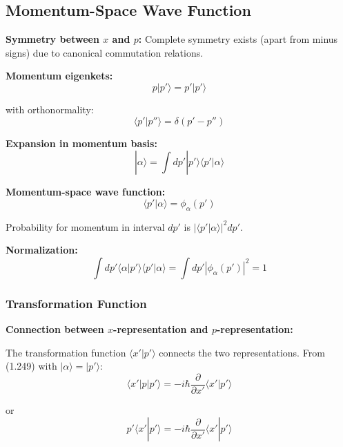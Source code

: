 \documentclass[11pt,a4paper]{article}
\begin{document}
\subsection{Momentum-Space Wave Function}

\textbf{Symmetry between $x$ and $p$:} Complete symmetry exists (apart from minus signs) due to canonical commutation relations.

\textbf{Momentum eigenkets:}
\begin{equation}
p|p'\rangle = p'|p'\rangle
\tag{1.254}
\end{equation}

with orthonormality:
\begin{equation}
\langle p'|p''\rangle = \delta(p' - p'')
\tag{1.255}
\end{equation}

\textbf{Expansion in momentum basis:}
\begin{equation}
|\alpha\rangle = \int dp'|p'\rangle\langle p'|\alpha\rangle
\tag{1.256}
\end{equation}

\textbf{Momentum-space wave function:}
\begin{equation}
\boxed{\langle p'|\alpha\rangle = \phi_\alpha(p')}
\tag{1.257}
\end{equation}

Probability for momentum in interval $dp'$ is $|\langle p'|\alpha\rangle|^2dp'$.

\textbf{Normalization:}
\begin{equation}
\int dp'\langle\alpha|p'\rangle\langle p'|\alpha\rangle = \int dp'|\phi_\alpha(p')|^2 = 1
\tag{1.258}
\end{equation}

\subsubsection{Transformation Function}

\textbf{Connection between $x$-representation and $p$-representation:}

The transformation function $\langle x'|p'\rangle$ connects the two representations. From (1.249) with $|\alpha\rangle = |p'\rangle$:
\begin{equation}
\langle x'|p|p'\rangle = -i\hbar\frac{\partial}{\partial x'}\langle x'|p'\rangle
\tag{1.259}
\end{equation}

or
\begin{equation}
p'\langle x'|p'\rangle = -i\hbar\frac{\partial}{\partial x'}\langle x'|p'\rangle
\tag{1.260}
\end{equation}
\end{document}
